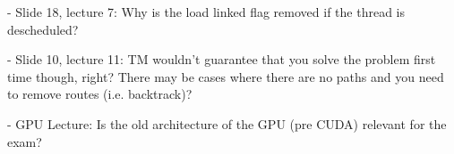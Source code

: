 - Slide 18, lecture 7: Why is the load linked flag removed if the
thread is descheduled?

- Slide 10, lecture 11: TM wouldn't guarantee that you solve the
problem first time though, right? There may be cases where there are
no paths and you need to remove routes (i.e. backtrack)?

- GPU Lecture: Is the old architecture of the GPU (pre CUDA) relevant
for the exam?
